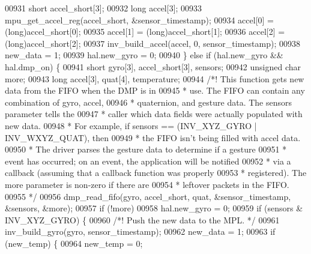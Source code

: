 \begin{DoxyCode}
{{{{{{{{00931             \textcolor{keywordtype}{short} accel\_short[3];
00932             \textcolor{keywordtype}{long} accel[3];
00933             mpu\_get\_accel\_reg(accel\_short, &sensor\_timestamp);
00934             accel[0] = (\textcolor{keywordtype}{long})accel\_short[0];
00935             accel[1] = (\textcolor{keywordtype}{long})accel\_short[1];
00936             accel[2] = (\textcolor{keywordtype}{long})accel\_short[2];
00937             inv\_build\_accel(accel, 0, sensor\_timestamp);
00938             new\_data = 1;
00939             hal.new_gyro = 0;
00940         \} \textcolor{keywordflow}{else} \textcolor{keywordflow}{if} (hal.new_gyro && hal.dmp_on) \{
00941             \textcolor{keywordtype}{short} gyro[3], accel\_short[3], sensors;
00942             \textcolor{keywordtype}{unsigned} \textcolor{keywordtype}{char} more;
00943             \textcolor{keywordtype}{long} accel[3], quat[4], temperature;
00944             \textcolor{comment}{/*! This function gets new data from the FIFO when the DMP is in}
00945 \textcolor{comment}{             * use. The FIFO can contain any combination of gyro, accel,}
00946 \textcolor{comment}{             * quaternion, and gesture data. The sensors parameter tells the}
00947 \textcolor{comment}{             * caller which data fields were actually populated with new data.}
00948 \textcolor{comment}{             * For example, if sensors == (INV\_XYZ\_GYRO | INV\_WXYZ\_QUAT), then}
00949 \textcolor{comment}{             * the FIFO isn't being filled with accel data.}
00950 \textcolor{comment}{             * The driver parses the gesture data to determine if a gesture}
00951 \textcolor{comment}{             * event has occurred; on an event, the application will be notified}
00952 \textcolor{comment}{             * via a callback (assuming that a callback function was properly}
00953 \textcolor{comment}{             * registered). The more parameter is non-zero if there are}
00954 \textcolor{comment}{             * leftover packets in the FIFO.}
00955 \textcolor{comment}{             */}
00956             dmp\_read\_fifo(gyro, accel\_short, quat, &sensor\_timestamp, &sensors, &more);
00957             \textcolor{keywordflow}{if} (!more)
00958                 hal.new_gyro = 0;
00959             \textcolor{keywordflow}{if} (sensors & INV\_XYZ\_GYRO) \{
00960                 \textcolor{comment}{/*! Push the new data to the MPL. */}
00961                 inv\_build\_gyro(gyro, sensor\_timestamp);
00962                 new\_data = 1;
00963                 \textcolor{keywordflow}{if} (new\_temp) \{
00964                     new\_temp = 0;
}}}}}}}}
\end{DoxyCode}
